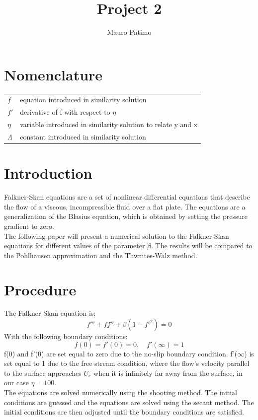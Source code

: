 \documentclass[conf]{new-aiaa}
\title{Project 2}
\author{Mauro Patimo}
\begin{document}
\maketitle

\section{Nomenclature}

{\renewcommand\arraystretch{1.0}
\noindent\begin{longtable*}{@{}l @{\quad=\quad} l@{}}
$f$  & equation introduced in similarity solution \\
$f'$ & derivative of f with respect to $\eta$ \\
$\eta$ & variable introduced in similarity solution to relate y and x\\
$\Lambda$ & constant introduced in similarity solution \\

\end{longtable*}}

\section{Introduction}
Falkner-Skan equations are a set of nonlinear differential equations that describe the flow of a viscous, incompressible fluid over a flat plate. The equations are a generalization of the Blasius equation, which is obtained by setting the pressure gradient to zero. \\
The following paper will present a numerical solution to the Falkner-Skan equations for different values of the parameter $\beta$. 
The results will be compared to the Pohlhausen approximation and the Thwaites-Walz method.\\
\section{Procedure}
The Falkner-Skan equation is:
\begin{equation}
    f'''+ff''+\beta(1-f'^2)=0
\end{equation}
With the following boundary conditions:
\begin{equation}
    f(0)=f'(0)=0, \quad f'(\infty)=1
\end{equation}
f(0) and f'(0) are set equal to zero due to the no-slip boundary condition. f'($\infty$) is set equal to 1 due to the free stream condition, where the flow's velocity parallel to the surface approaches $U_e$ when it is infinitely far away from the surface, in our case $\eta=100$. \\
The equations are solved numerically using the shooting method. The initial conditions are guessed and the equations are solved using the secant method. The initial conditions are then adjusted until the boundary conditions are satisfied. \\
\end{document}
